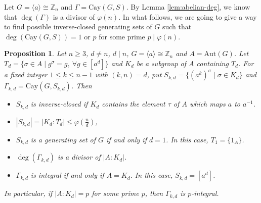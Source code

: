 \documentclass[12pt,a4paper]{article}
\newtheorem{pro}[thm]{Proposition}
\def \leq {\leqslant}
\def \geq {\geqslant}
\begin{document}
	Let $G=\langle a\rangle\cong\mathbb Z_n$ and $\Gamma=\mathrm{Cay}(G,S)$. 
	By Lemma \ref{lem:abelian-deg}, we know that $\deg(\Gamma)$ is a divisor of $\varphi(n)$. 
	In what follows, we are going to give a way to find possible inverse-closed generating sets of $G$ such that $\deg(\mathrm{Cay}(G,S))=1$ or $p$ for some prime $p\mid \varphi(n)$.
	\begin{pro}\label{action}
		Let $n\geq 3$,  $d\neq n$, $d\mid n$, $G=\langle a\rangle\cong\mathbb Z_n$ and $A=\mathrm{Aut}(G)$. Let $T_d=\{\sigma\in A\mid g^\sigma=g,~\forall g\in[a^d]\}$ and $K_d$ be a subgroup of $A$ containing $T_d$.
		For a fixed integer $1\leq k\leq n-1$ with $(k,n)=d$, put $S_{k,d}=\{(a^k)^\sigma\mid \sigma\in K_d\}$ and $\Gamma_{k,d}=\mathrm{Cay}(G,S_{k,d})$. Then
		\begin{itemize}
			\item[$(1)$] $S_{k,d}$ is inverse-closed if $K_d$ contains the element $\tau$ of $A$ which maps $a$ to $a^{-1}$.
			\item[$(2)$] $|S_{k,d}|=|K_d:T_d|\leq \varphi(\frac{n}{d})$,
			\item[$(3)$] $S_{k,d}$ is a generating set of $G$ if and only if $d=1$. In this case, $T_1=\{1_A\}$.
			\item[$(4)$] $\deg(\Gamma_{k,d})$ is a divisor of $|A:K_d|$.
			\item[$(5)$] $\Gamma_{k,d}$ is integral if and only if $A=K_d$. In this case, $S_{k,d}=[a^d]$. 
		\end{itemize} 
		In particular, if $|A:K_d|=p$ for some prime $p$, then $\Gamma_{k,d}$ is $p$-integral.
	\end{pro}
\end{document}
